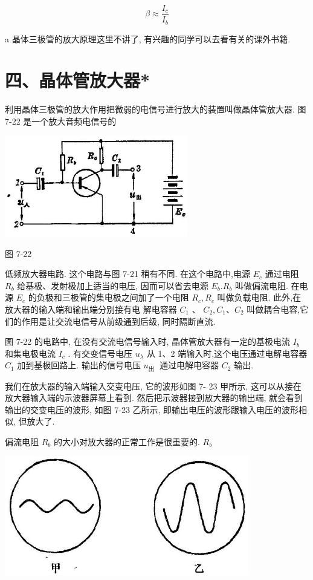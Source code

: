 \documentclass[10pt]{article}
\begin{document}
\[
\beta \approx \frac{{I}_{c}}{{I}_{b}}
\]

a 晶体三极管的放大原理这里不讲了, 有兴趣的同学可以去看有关的课外书籍.

\section*{四、晶体管放大器*}

利用晶体三极管的放大作用把微弱的电信号进行放大的装置叫做晶体管放大器. 图 7-22 是一个放大音频电信号的

\begin{center}
\includegraphics[max width=0.6\textwidth]{images/01913056-1f15-74d8-9184-9aab52c9d66b_234_688981.jpg}
\end{center}

图 7-22

低频放大器电路. 这个电路与图 7-21 稍有不同. 在这个电路中,电源 \({E}_{c}\) 通过电阻 \({R}_{b}\) 给基极、发射极加上适当的电压, 因而可以省去电源 \({E}_{b}.{R}_{b}\) 叫做偏流电阻. 在电源 \({E}_{c}\) 的负极和三极管的集电极之间加了一个电阻 \({R}_{c},{R}_{c}\) 叫做负载电阻. 此外,在放大器的输入端和输出端分别接有电 解电容器 \({C}_{1}\) 、 \({C}_{2},{C}_{1}\text{、}{C}_{2}\) 叫做耦合电容,它们的作用是让交流电信号从前级通到后级, 同时隔断直流.

图 7-22 的电路中, 在没有交流电信号输入时, 晶体管放大器有一定的基极电流 \({I}_{b}\) 和集电极电流 \({I}_{c}\) . 有交变信号电压 \({u}_{\lambda }\) 从 1、2 端输入时,这个电压通过电解电容器 \({C}_{1}\) 加到基极回路上. 输出的信号电压 \({u}_{\text{出 }}\) 通过电解电容器 \({C}_{2}\) 输出.

我们在放大器的输入端输入交变电压, 它的波形如图 7- 23 甲所示, 这可以从接在放大器输入端的示波器屏幕上看到. 然后把示波器接到放大器的输出端, 就会看到输出的交变电压的波形, 如图 7-23 乙所示, 即输出电压的波形跟输入电压的波形相似, 但放大了.

偏流电阻 \({R}_{b}\) 的大小对放大器的正常工作是很重要的. \({R}_{b}\)

\begin{center}
\includegraphics[max width=0.8\textwidth]{images/01913056-1f15-74d8-9184-9aab52c9d66b_235_597220.jpg}
\end{center}
\end{document}
